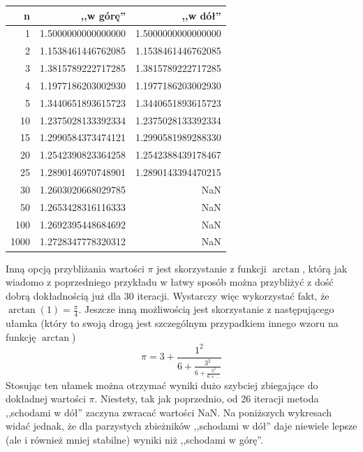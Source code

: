 \documentclass[11pt,leqno]{article}
\begin{document}
\begin{center}
\begin{tabular}{ r || r | r }
  \hline
  n & ,,w górę'' & ,,w dół''\\
  \hline \hline
  1 & 1.5000000000000000 & 1.5000000000000000 \\
  2 & 1.1538461446762085 & 1.1538461446762085 \\
  3 & 1.3815789222717285 & 1.3815789222717285 \\
  4 & 1.1977186203002930 & 1.1977186203002930 \\
  5 & 1.3440651893615723 & 1.3440651893615723 \\
  10 & 1.2375028133392334 & 1.2375028133392334 \\
  15 & 1.2990584373474121 & 1.2990581989288330 \\
  20 & 1.2542390823364258 & 1.2542388439178467 \\
  25 & 1.2890146970748901 & 1.2890143394470215 \\
  30 & 1.2603020668029785 & NaN \\
  50 & 1.2653428316116333 & NaN \\
  100 & 1.2692395448684692 & NaN \\
  1000 & 1.2728347778320312 & NaN \\
\end{tabular}
\end{center}

Inną opcją przybliżania wartości $\pi$ jest skorzystanie z funkcji $\arctan$, którą jak wiadomo z poprzedniego przykładu w łatwy sposób można przybliżyć z dość dobrą dokładnością już dla 30 iteracji. Wystarczy więc wykorzystać fakt, że $\arctan(1) = \frac{\pi}{4}$. Jeszcze inną możliwością jest skorzystanie z następującego ułamka (który to swoją drogą jest szczególnym przypadkiem innego wzoru na funkcję $\arctan$)
\[
\pi
=
3 + \frac{1^2}{\displaystyle
  6 + \frac{3^2}{\displaystyle
    6 + \frac{5^2}{\displaystyle
      6 + \dots
    }
  }
}
\]
Stosując ten ułamek można otrzymać wyniki dużo szybciej zbiegające do dokładnej wartości $\pi$. Niestety, tak jak poprzednio, od 26 iteracji metoda ,,schodami w dół'' zaczyna zwracać wartości NaN. Na poniższych wykresach widać jednak, że dla parzystych zbieżników ,,schodami w dół'' daje niewiele lepsze (ale i również mniej stabilne) wyniki niż ,,schodami w górę''.
\end{document}
